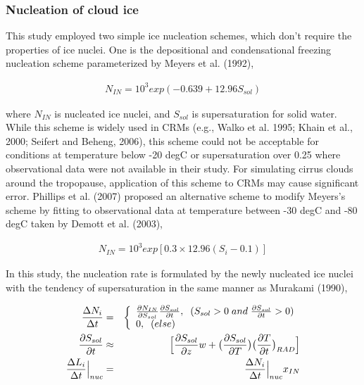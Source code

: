 \subsubsection{Nucleation of cloud ice}
This study employed two simple ice nucleation schemes, which don’t require the properties of ice nuclei. One is the depositional and condensational freezing nucleation scheme parameterized by Meyers et al. (1992),

\begin{eqnarray}
N_{IN}=10^{3}exp(-0.639+12.96S_{sol})\nonumber
\end{eqnarray}

where $N_{IN}$ is nucleated ice nuclei, and $S_{sol}$ is supersaturation for solid water. While this scheme is widely used in CRMs (e.g., Walko et al. 1995; Khain et al., 2000; Seifert and Beheng, 2006), this scheme could not be acceptable for conditions at temperature below -20 degC or supersaturation over 0.25 where observational data were not available in their study. For simulating cirrus clouds around the tropopause, application of this scheme to CRMs may cause significant error. Phillips et al. (2007) proposed an alternative scheme to modify Meyers’s scheme by fitting to observational data at temperature between -30 degC and -80 degC taken by Demott et al. (2003),

\begin{eqnarray}
N_{IN}=10^{3}exp[0.3\times12.96(S_{i}-0.1)]\label{sn117}
\end{eqnarray}

In this study, the nucleation rate is formulated by the newly nucleated ice nuclei with the tendency of supersaturation in the same manner as Murakami (1990),

\begin{eqnarray}
\frac{\Delta N_{i}}{\Delta t}&=&
\left\{
\begin{array}{l}
\frac{\partial N_{IN}}{\partial S_{sol}}\frac{\partial S_{sol}}{\partial t},\;\;(S_{sol}>0\;and\;\frac{\partial S_{sol}}{\partial t}>0) \\
0,\;\;(else) \\
\end{array}
\right.\\
\label{sn118}
\frac{\partial S_{sol}}{\partial t}&\approx& \Bigl[\frac{\partial S_{sol}}{\partial z}w+\bigl(\frac{\partial S_{sol}}{\partial T}\bigr)\bigl(\frac{\partial T}{\partial t}\bigr)_{RAD}\Bigr]\nonumber\\
\frac{\Delta L_{i}}{\Delta t}\Bigr|_{nuc}&=&\frac{\Delta N_{i}}{\Delta t}\Bigr|_{nuc}x_{IN}\label{sn119}
\end{eqnarray}


